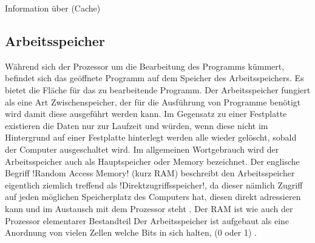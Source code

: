 Information über (Cache)


\subsection{Arbeitsspeicher}
\label{subsec:memory}

Während sich der Prozessor um die Bearbeitung des Programms kümmert, befindet sich das geöffnete Programm auf dem Speicher des Arbeitsspeichers. Es bietet die Fläche für das zu bearbeitende Programm. Der Arbeitsspeicher fungiert als eine Art Zwischenspeicher, der für die Ausführung von Programme benötigt wird damit diese ausgeführt werden kann. 
Im Gegensatz zu einer Festplatte existieren die Daten nur zur Laufzeit und würden, wenn diese nicht im Hintergrund auf einer Festplatte hinterlegt werden alle wieder gelöscht, sobald der Computer ausgeschaltet wird. Im allgemeinen Wortgebrauch wird der Arbeitsspeicher auch als Hauptspeicher oder Memory bezeichnet. Der englische Begriff !Random Access Memory! (kurz RAM) beschreibt den Arbeitsspeicher eigentlich ziemlich treffend als !Direktzugriffsspeicher!, da dieser nämlich Zugriff auf jeden möglichen Speicherplatz des Computers hat, diesen direkt adressieren kann und im Austausch mit dem Prozessor steht \cite{haugen2000}. 
Der RAM ist wie auch der Prozessor elementarer Bestandteil 
Der Arbeitsspeicher ist aufgebaut als eine Anordnung von vielen Zellen welche Bits in sich halten, (0 oder 1) \cite{haugen2000}.  %

